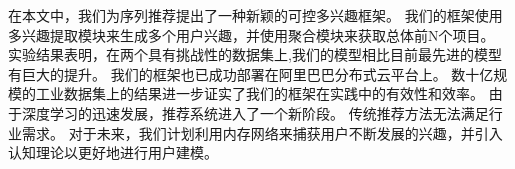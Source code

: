
在本文中，我们为序列推荐提出了一种新颖的可控多兴趣框架。 我们的框架使用多兴趣提取模块来生成多个用户兴趣，并使用聚合模块来获取总体前N个项目。
实验结果表明，在两个具有挑战性的数据集上,我们的模型相比目前最先进的模型有巨大的提升。 我们的框架也已成功部署在阿里巴巴分布式云平台上。 数十亿规模的工业数据集上的结果进一步证实了我们的框架在实践中的有效性和效率。 由于深度学习的迅速发展，推荐系统进入了一个新阶段。 传统推荐方法无法满足行业需求。 对于未来，我们计划利用内存网络来捕获用户不断发展的兴趣，并引入认知理论以更好地进行用户建模。
